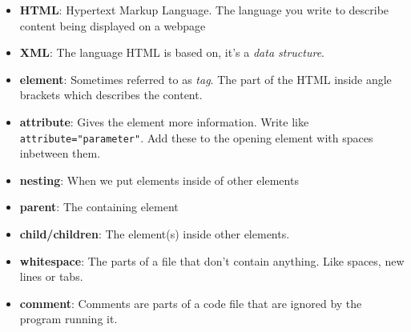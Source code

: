 \begin{itemize}[leftmargin=*]
    \item
        \textbf{HTML}:
        Hypertext Markup Language. The language you write to describe content being displayed on a webpage
    \item
        \textbf{XML}:
        The language HTML is based on, it's a \textit{data structure}.
    \item
        \textbf{element}:
        Sometimes referred to as \textit{tag}. The part of the HTML inside angle brackets which describes the content.
    \item
        \textbf{attribute}:
        Gives the element more information. Write like \texttt{attribute="parameter"}. Add these to the opening element with spaces inbetween them.
    \item
        \textbf{nesting}:
        When we put elements inside of other elements
    \item
        \textbf{parent}:
        The containing element
    \item
        \textbf{child/children}:
        The element(s) inside other elements.
    \item
        \textbf{whitespace}:
        The parts of a file that don't contain anything. Like spaces, new lines or tabs.
    \item
        \textbf{comment}:
        Comments are parts of a code file that are ignored by the program running it.

\end{itemize}
